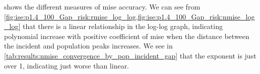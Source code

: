 

 shows the different measures of \gls{mise} accuracy.
We can see from \cref{fig:ise:p1.4_100_Gap_risk:rmise_log_log,fig:ise:p1.4_100_Gap_risk:nmise_log_log} that there is a linear relationship in the log-log graph,
indicating polynomial increase with positive coefficient of \gls{mise} when the distance between the incident and population peaks increases.
We see in \cref{tab:results:nmise_convergence_by_pop_incident_gap} that the exponent is just over 1,
indicating just worse than linear.


\graphicspath{{./}}
